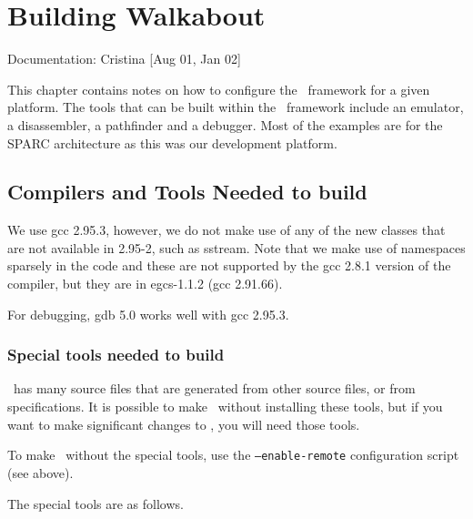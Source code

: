 %
%

\chapter{Building Walkabout}
\label{ch-config}

{\small
\begin{flushright}
Documentation: Cristina [Aug 01, Jan 02]
\end{flushright}
}

This chapter contains notes on how to configure the \walk\ framework
for a given platform.  
The tools that can be built within the \walk\ framework include 
an emulator, a disassembler, a pathfinder and a debugger. 
Most of the examples are for the SPARC architecture as this was 
our development platform.  


\section{Compilers and Tools Needed to build \walk}
We use gcc 2.95.3, however, we do not make use of any of the new 
classes that are not available in 2.95-2, such as sstream. 
Note that we make use of namespaces sparsely in the code and these
are not supported by the gcc 2.8.1 version of the compiler, 
but they are in egcs-1.1.2 (gcc 2.91.66). 

For debugging, gdb 5.0 works well with gcc 2.95.3.


\subsection{Special tools needed to build \walk}

\walk\ has many source files that are generated from other source files,
or from specifications. It is possible to make \walk\ without installing
these tools, but if you want to make significant changes to \walk, you will
need those tools.

To make \walk\ without the special tools, use the \texttt{--enable-remote}
configuration script (see above).

The special tools are as follows.

